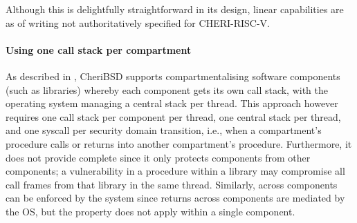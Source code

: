 \documentclass[main.tex]{subfiles}
\begin{document}
Although this  is delightfully straightforward in its design, linear capabilities are as of writing not authoritatively specified for CHERI-RISC-V.

\paragraph{Using one call stack per compartment} As described in \cite{compartment}, CheriBSD supports compartmentalising software components (such as libraries) whereby each component gets its own call stack, with the operating system managing a central stack per thread. This approach however requires one call stack per component per thread, one central stack per thread, and one syscall per security domain transition, i.e., when a compartment's procedure calls or returns into another compartment's procedure. Furthermore, it does not provide complete  since it only protects components from other components; a vulnerability in a procedure within a library may compromise all call frames from that library in the same thread. Similarly,  across components can be enforced by the system since returns across components are mediated by the OS, but the property does not apply within a single component.

\biblio{}
\onlyinsubfile{\glsaddall\printglossaries}
\end{document}
